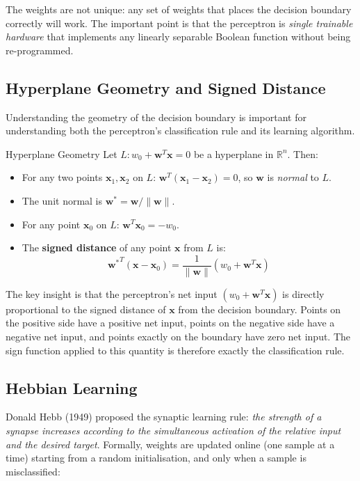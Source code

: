 \documentclass[11pt,a4paper]{article}
\newcommand{\term}[1]{\textcolor{DefGreen}{\textbf{#1}}}
\begin{document}
The weights are not unique: any set of weights that places the decision boundary correctly will work. The important point is that the perceptron is \emph{single trainable hardware} that implements any linearly separable Boolean function without being re-programmed.

\subsection{Hyperplane Geometry and Signed Distance}
\label{sec:hyperplane}

Understanding the geometry of the decision boundary is important for understanding both the perceptron's classification rule and its learning algorithm.

\begin{thmbox}{Hyperplane Geometry}
Let $L: w_0 + \mathbf{w}^T\mathbf{x} = 0$ be a hyperplane in $\mathbb{R}^n$. Then:
\begin{itemize}
  \item For any two points $\mathbf{x}_1, \mathbf{x}_2$ on $L$: $\mathbf{w}^T(\mathbf{x}_1 - \mathbf{x}_2) = 0$, so $\mathbf{w}$ is \emph{normal} to $L$.
  \item The unit normal is $\mathbf{w}^* = \mathbf{w}/\|\mathbf{w}\|$.
  \item For any point $\mathbf{x}_0$ on $L$: $\mathbf{w}^T\mathbf{x}_0 = -w_0$.
  \item The \term{signed distance} of any point $\mathbf{x}$ from $L$ is:
  \[
  {\mathbf{w}^*}^T(\mathbf{x} - \mathbf{x}_0) = \frac{1}{\|\mathbf{w}\|}(w_0 + \mathbf{w}^T\mathbf{x})
  \]
\end{itemize}
\end{thmbox}

The key insight is that the perceptron's net input $(w_0 + \mathbf{w}^T\mathbf{x})$ is directly proportional to the signed distance of $\mathbf{x}$ from the decision boundary. Points on the positive side have a positive net input, points on the negative side have a negative net input, and points exactly on the boundary have zero net input. The sign function applied to this quantity is therefore exactly the classification rule.

\subsection{Hebbian Learning}

Donald Hebb (1949) proposed the synaptic learning rule: \emph{the strength of a synapse increases according to the simultaneous activation of the relative input and the desired target}. Formally, weights are updated online (one sample at a time) starting from a random initialisation, and only when a sample is misclassified:
\end{document}
